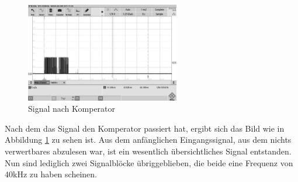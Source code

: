 \begin{figure}[H]
\includegraphics[width=0.6\textwidth, draft]{Abbildungen/Signal nach Komperator.png}\caption{Signal nach Komperator}\label{fig:Komperator}
\end{figure}
Nach dem das Signal den Komperator passiert hat, ergibt sich das Bild wie in Abbildung \ref{fig:Komperator} zu sehen ist. Aus dem anfänglichen Eingangssignal, aus dem nichts verwertbares abzulesen war, ist ein wesentlich übersichtliches Signal entstanden. Nun sind lediglich zwei Signalblöcke übriggeblieben, die beide eine Frequenz von 40kHz zu haben scheinen.
